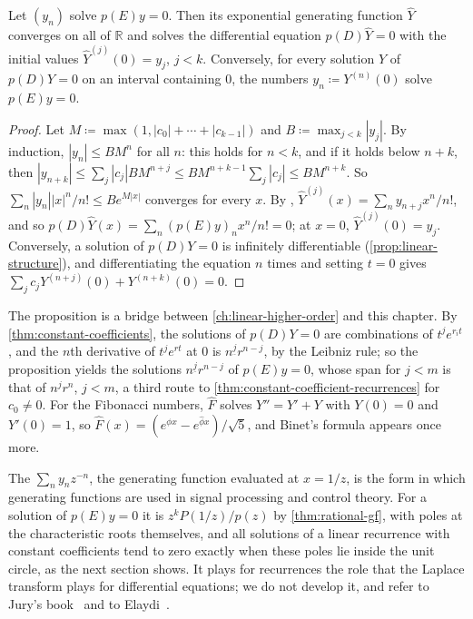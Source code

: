 \begin{proposition}
\label{prop:egf-recurrence}
Let $(y_n)$ solve $p(E)y=0$. Then its exponential generating function $\hat Y$ converges on all of $\mathbb R$ and solves the differential equation $p(D)\hat Y=0$ with the initial values $\hat Y^{(j)}(0)=y_j$, $j<k$. Conversely, for every solution $Y$ of $p(D)Y=0$ on an interval containing $0$, the numbers $y_n\coloneqq Y^{(n)}(0)$ solve $p(E)y=0$.
\end{proposition}

\begin{proof}
Let $M\coloneqq\max(1,|c_0|+\cdots+|c_{k-1}|)$ and $B\coloneqq\max_{j<k}|y_j|$. By induction, $|y_n|\le BM^n$ for all $n$: this holds for $n<k$, and if it holds below $n+k$, then $|y_{n+k}|\le\sum_j|c_j|BM^{n+j}\le BM^{n+k-1}\sum_j|c_j|\le BM^{n+k}$. So $\sum_n|y_n||x|^n/n!\le Be^{M|x|}$ converges for every $x$. By , $\hat Y^{(j)}(x)=\sum_ny_{n+j}x^n/n!$, and so $p(D)\hat Y(x)=\sum_n(p(E)y)_nx^n/n!=0$; at $x=0$, $\hat Y^{(j)}(0)=y_j$. Conversely, a solution of $p(D)Y=0$ is infinitely differentiable (\cref{prop:linear-structure}), and differentiating the equation $n$ times and setting $t=0$ gives $\sum_jc_jY^{(n+j)}(0)+Y^{(n+k)}(0)=0$.
\end{proof}

The proposition is a bridge between \cref{ch:linear-higher-order} and this chapter. By \cref{thm:constant-coefficients}, the solutions of $p(D)Y=0$ are combinations of $t^je^{r_it}$, and the $n$th derivative of $t^je^{rt}$ at $0$ is $n^{\underline j}r^{n-j}$, by the Leibniz rule; so the proposition yields the solutions $n^{\underline j}r^{n-j}$ of $p(E)y=0$, whose span for $j<m$ is that of $n^jr^n$, $j<m$, a third route to \cref{thm:constant-coefficient-recurrences} for $c_0\ne0$. For the Fibonacci numbers, $\hat F$ solves $Y''=Y'+Y$ with $Y(0)=0$ and $Y'(0)=1$, so $\hat F(x)=(e^{\phi x}-e^{\hat\phi x})/\sqrt5$, and Binet's formula appears once more.

The  $\sum_ny_nz^{-n}$, the generating function evaluated at $x=1/z$, is the form in which generating functions are used in signal processing and control theory. For a solution of $p(E)y=0$ it is $z^kP(1/z)/p(z)$ by \cref{thm:rational-gf}, with poles at the characteristic roots themselves, and all solutions of a linear recurrence with constant coefficients tend to zero exactly when these poles lie inside the unit circle, as the next section shows. It plays for recurrences the role that the Laplace transform plays for differential equations; we do not develop it, and refer to Jury's book~\cite{jury1964} and to Elaydi~\cite[Chap.~6]{elaydi2005}.

